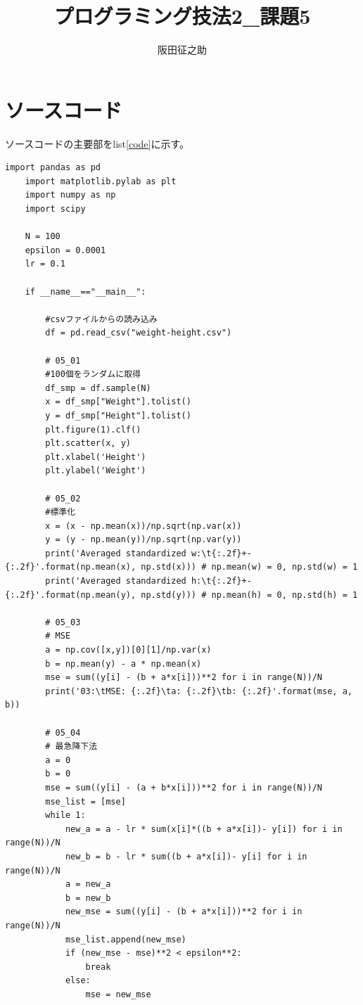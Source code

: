 \documentclass[a4paper]{ltjsarticle}
\begin{document}
\title{プログラミング技法2\_課題5}
\author{阪田征之助}
\maketitle
\newpage
\section*{ソースコード}
ソースコードの主要部をlist\ref{code}に示す。

\begin{lstlisting}[caption=code,label=code]
    import pandas as pd
    import matplotlib.pylab as plt
    import numpy as np
    import scipy
    
    N = 100
    epsilon = 0.0001
    lr = 0.1
    
    if __name__=="__main__":
        
        #csvファイルからの読み込み
        df = pd.read_csv("weight-height.csv")
        
        # 05_01
        #100個をランダムに取得
        df_smp = df.sample(N)
        x = df_smp["Weight"].tolist()
        y = df_smp["Height"].tolist()
        plt.figure(1).clf()
        plt.scatter(x, y)
        plt.xlabel('Height')
        plt.ylabel('Weight')
        
        # 05_02
        #標準化
        x = (x - np.mean(x))/np.sqrt(np.var(x))
        y = (y - np.mean(y))/np.sqrt(np.var(y))
        print('Averaged standardized w:\t{:.2f}+-{:.2f}'.format(np.mean(x), np.std(x))) # np.mean(w) = 0, np.std(w) = 1
        print('Averaged standardized h:\t{:.2f}+-{:.2f}'.format(np.mean(y), np.std(y))) # np.mean(h) = 0, np.std(h) = 1
        
        # 05_03
        # MSE
        a = np.cov([x,y])[0][1]/np.var(x)
        b = np.mean(y) - a * np.mean(x) 
        mse = sum((y[i] - (b + a*x[i]))**2 for i in range(N))/N
        print('03:\tMSE: {:.2f}\ta: {:.2f}\tb: {:.2f}'.format(mse, a, b))
        
        # 05_04
        # 最急降下法
        a = 0
        b = 0
        mse = sum((y[i] - (a + b*x[i]))**2 for i in range(N))/N
        mse_list = [mse]
        while 1:
            new_a = a - lr * sum(x[i]*((b + a*x[i])- y[i]) for i in range(N))/N
            new_b = b - lr * sum((b + a*x[i])- y[i] for i in range(N))/N
            a = new_a
            b = new_b
            new_mse = sum((y[i] - (b + a*x[i]))**2 for i in range(N))/N
            mse_list.append(new_mse)
            if (new_mse - mse)**2 < epsilon**2:
                break
            else:
                mse = new_mse
        

\end{lstlisting}
\end{document}
